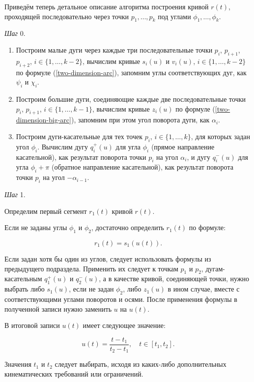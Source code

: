 Приведём теперь детальное описание алгоритма построения кривой $r(t)$, проходящей последовательно через точки
$p_1,\dots,p_k$ под углами $\phi_1,\dots,\phi_k$.

\bigskip
\textit{Шаг} 0.

\begin{enumerate}
\item Построим малые дуги через каждые три последовательные точки $p_i$, $p_{i+1}$, $p_{i+2}$,
$i \in \{1,\dots,k-2\}$, вычислим кривые $s_i(u)$ и $v_i(u)$, $i \in \{1,\dots,k-2\}$ по формуле
(\ref{two-dimension-arc}), запомним углы соответствующих дуг, как $\psi_i$ и $\chi_i$.
\item Построим большие дуги, соединяющие каждые две последовательные точки $p_i$, $p_{i+1}$, $i \in \{1,\dots,k-1\}$,
вычислим кривые $z_i(u)$ по формуле (\ref{two-dimension-big-arc}), запомним при этом угол поворота дуги, как $\alpha_i$.
\item Построим дуги-касательные для тех точек $p_i$, $i \in \{1,\dots,k\}$, для которых задан угол $\phi_i$.
Вычислим дугу $q_i^+(u)$ для угла $\phi_i$ (прямое направление касательной), как результат поворота точки $p_i$
на угол $\alpha_i$, и дугу $q_i^-(u)$ для угла $\phi_i+\pi$ (обратное направление касательной), как результат поворота
точки $p_i$ на угол $-\alpha_{i-1}$.
\end{enumerate}

\bigskip
\textit{Шаг} 1.

Определим первый сегмент $r_1(t)$ кривой $r(t)$.

Если не заданы углы $\phi_1$ и $\phi_2$, достаточно определить $r_1(t)$ по формуле:

$$
r_1(t)=s_1(u(t)).
$$

Если задан хотя бы один из углов, следует использовать формулы из предыдущего подраздела. Применить их следует к
точкам $p_1$ и $p_2$, дугам-касательным $q_1^+(u)$ и $q_2^-(u)$, а в качестве кривой, соединяющей точки, нужно
выбрать либо $s_1(u)$, если не задан $\phi_2$, либо $z_1(u)$ в ином случае, вместе с соответствующими углами
поворотов и осями. После применения формулы в полученной записи нужно заменить $u$ на $u(t)$.

В итоговой записи $u(t)$ имеет следующее значение:

$$
u(t)=\frac{t-t_1}{t_2-t_1}, \quad t \in [t_1,t_2].
$$

Значения $t_1$ и $t_2$ следует выбирать, исходя из каких-либо дополнительных кинематических требований или ограничений.

